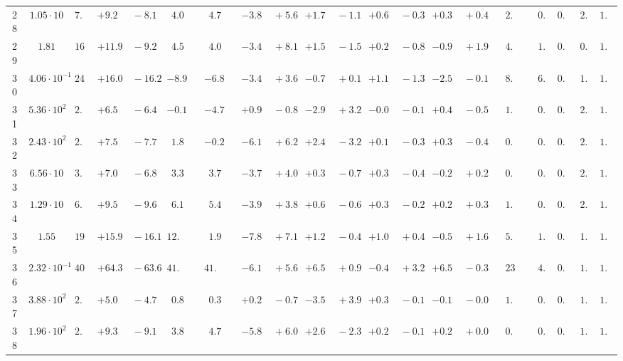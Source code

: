 \documentclass[12pt]{article}
\begin{document}
\begin{table}
\begin{tabular}{ccrr@{\hskip0pt}rrc@{\hskip0pt}r@{\hskip0pt}c@{\hskip0pt}r@{\hskip0pt}rr@{\hskip0pt}rr@{\hskip0pt}rr@{\hskip0pt}rr@{\hskip0pt}r@{\hskip0pt}r@{\hskip0pt}c|rr|r}
28 &$1.05 \cdot 10$ &$ 7.7$  & ${+9.2~}$&${~-8.1}$ & $ 4.0$  & &$ 4.7$&&${-3.8~}$&${~+5.6}$ & ${+1.7~}$&${~-1.1}$ & ${+0.6~}$&${~-0.3}$ & ${+0.3~}$&${~+0.4}$ & &$ 2.0$&&$ 0.7$  & $0.95$  & $ 2.1$  & $1.03$   \\ 
29 &$1.81$ &$16.0$  & ${+11.9~}$&${~-9.2}$ & $ 4.5$  & &$ 4.0$&&${-3.4~}$&${~+8.1}$ & ${+1.5~}$&${~-1.5}$ & ${+0.2~}$&${~-0.8}$ & ${-0.9~}$&${~+1.9}$ & &$ 4.8$&&$ 1.8$  & $0.96$  & $ 0.9$  & $1.01$   \\ 
30 &$4.06 \cdot 10^{-1}$ &$24.9$  & ${+16.0~}$&${~-16.2}$ & $-8.9$  & &$-6.8$&&${-3.4~}$&${~+3.6}$ & ${-0.7~}$&${~+0.1}$ & ${+1.1~}$&${~-1.3}$ & ${-2.5~}$&${~-0.1}$ & &$ 8.4$&&$ 6.3$  & $0.95$  & $ 1.4$  & $1.00$   \\ 
31 &$5.36 \cdot 10^{2}$ &$ 2.5$  & ${+6.5~}$&${~-6.4}$ & $-0.1$  & &$-4.7$&&${+0.9~}$&${~-0.8}$ & ${-2.9~}$&${~+3.2}$ & ${-0.0~}$&${~-0.1}$ & ${+0.4~}$&${~-0.5}$ & &$ 1.0$&&$ 0.3$  & $0.89$  & $ 2.6$  & $1.03$   \\ 
32 &$2.43 \cdot 10^{2}$ &$ 2.3$  & ${+7.5~}$&${~-7.7}$ & $ 1.8$  & &$-0.2$&&${-6.1~}$&${~+6.2}$ & ${+2.4~}$&${~-3.2}$ & ${+0.1~}$&${~-0.3}$ & ${+0.3~}$&${~-0.4}$ & &$ 0.8$&&$ 0.1$  & $0.94$  & $ 2.3$  & $1.02$   \\ 
33 &$6.56 \cdot 10$ &$ 3.1$  & ${+7.0~}$&${~-6.8}$ & $ 3.3$  & &$ 3.7$&&${-3.7~}$&${~+4.0}$ & ${+0.3~}$&${~-0.7}$ & ${+0.3~}$&${~-0.4}$ & ${-0.2~}$&${~+0.2}$ & &$ 0.8$&&$ 0.4$  & $0.95$  & $ 2.3$  & $1.02$   \\ 
34 &$1.29 \cdot 10$ &$ 6.3$  & ${+9.5~}$&${~-9.6}$ & $ 6.1$  & &$ 5.4$&&${-3.9~}$&${~+3.8}$ & ${+0.6~}$&${~-0.6}$ & ${+0.3~}$&${~-0.2}$ & ${+0.2~}$&${~+0.3}$ & &$ 1.6$&&$ 0.9$  & $0.95$  & $ 2.0$  & $1.03$   \\ 
35 &$1.55$ &$19.6$  & ${+15.9~}$&${~-16.1}$ & $12.6$  & &$ 1.9$&&${-7.8~}$&${~+7.1}$ & ${+1.2~}$&${~-0.4}$ & ${+1.0~}$&${~+0.4}$ & ${-0.5~}$&${~+1.6}$ & &$ 5.0$&&$ 1.7$  & $0.96$  & $ 1.3$  & $1.02$   \\ 
36 &$2.32 \cdot 10^{-1}$ &$40.1$  & ${+64.3~}$&${~-63.6}$ & $41.7$  & &$41.0$&&${-6.1~}$&${~+5.6}$ & ${+6.5~}$&${~+0.9}$ & ${-0.4~}$&${~+3.2}$ & ${+6.5~}$&${~-0.3}$ & &$23.7$&&$ 4.6$  & $0.95$  & $ 1.2$  & $1.07$   \\ 
37 &$3.88 \cdot 10^{2}$ &$ 2.9$  & ${+5.0~}$&${~-4.7}$ & $ 0.8$  & &$ 0.3$&&${+0.2~}$&${~-0.7}$ & ${-3.5~}$&${~+3.9}$ & ${+0.3~}$&${~-0.1}$ & ${-0.1~}$&${~-0.0}$ & &$ 1.2$&&$ 0.4$  & $0.89$  & $ 1.9$  & $1.03$   \\ 
38 &$1.96 \cdot 10^{2}$ &$ 2.4$  & ${+9.3~}$&${~-9.1}$ & $ 3.8$  & &$ 4.7$&&${-5.8~}$&${~+6.0}$ & ${+2.6~}$&${~-2.3}$ & ${+0.2~}$&${~-0.1}$ & ${+0.2~}$&${~+0.0}$ & &$ 0.8$&&$ 0.1$  & $0.94$  & $ 1.8$  & $1.02$   \\ 

\end{tabular}
\end{table}
\end{document}
